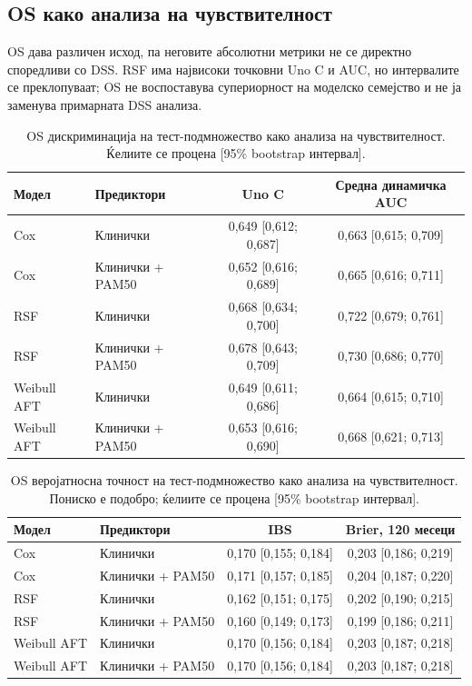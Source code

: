 \documentclass[12pt]{article}
\begin{document}
\subsection{OS како анализа на чувствителност}

OS дава различен исход, па неговите абсолютни метрики не се директно споредливи
со DSS. RSF има највисоки точковни Uno C и AUC, но интервалите се преклопуваат;
OS не воспоставува супериорност на моделско семејство и не ја заменува
примарната DSS анализа.

\begin{table}[ht]
\centering
\caption{OS дискриминација на тест-подмножество како анализа на чувствителност. Ќелиите се процена [95\% bootstrap интервал].}
\label{tab:os-performance}
\small
\begin{tabular}{llcc}
\hline
Модел & Предиктори & Uno C & Средна динамичка AUC \\
\hline
Cox & Клинички & 0,649 [0,612; 0,687] & 0,663 [0,615; 0,709] \\
Cox & Клинички + PAM50 & 0,652 [0,616; 0,689] & 0,665 [0,616; 0,711] \\
RSF & Клинички & 0,668 [0,634; 0,700] & 0,722 [0,679; 0,761] \\
RSF & Клинички + PAM50 & 0,678 [0,643; 0,709] & 0,730 [0,686; 0,770] \\
Weibull AFT & Клинички & 0,649 [0,611; 0,686] & 0,664 [0,615; 0,710] \\
Weibull AFT & Клинички + PAM50 & 0,653 [0,616; 0,690] & 0,668 [0,621; 0,713] \\
\hline
\end{tabular}
\end{table}
\begin{table}[ht]
\centering
\caption{OS веројатносна точност на тест-подмножество како анализа на чувствителност. Пониско е подобро; ќелиите се процена [95\% bootstrap интервал].}
\label{tab:os-performance-prob}
\small
\begin{tabular}{llcc}
\hline
Модел & Предиктори & IBS & Brier, 120 месеци \\
\hline
Cox & Клинички & 0,170 [0,155; 0,184] & 0,203 [0,186; 0,219] \\
Cox & Клинички + PAM50 & 0,171 [0,157; 0,185] & 0,204 [0,187; 0,220] \\
RSF & Клинички & 0,162 [0,151; 0,175] & 0,202 [0,190; 0,215] \\
RSF & Клинички + PAM50 & 0,160 [0,149; 0,173] & 0,199 [0,186; 0,211] \\
Weibull AFT & Клинички & 0,170 [0,156; 0,184] & 0,203 [0,187; 0,218] \\
Weibull AFT & Клинички + PAM50 & 0,170 [0,156; 0,184] & 0,203 [0,187; 0,218] \\
\hline
\end{tabular}
\end{table}
\end{document}
